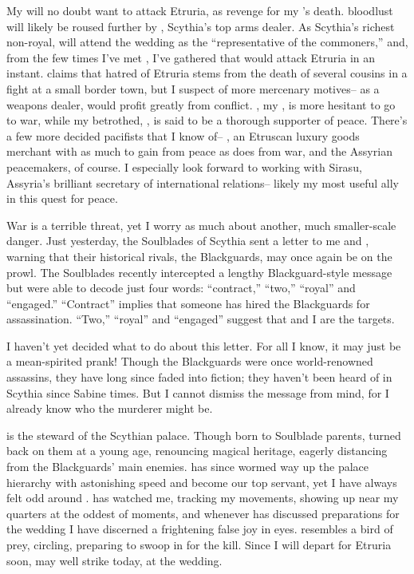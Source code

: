 \documentclass[char]{Kos}
\begin{document}
My \cScythiaQueen{\parent} will no doubt want to attack Etruria, as revenge for my \cFugitive{\sibling}'s death. \cScythiaQueen{\Their} bloodlust will likely be roused further by \cArmsDealer{}, Scythia's top arms dealer. As Scythia's richest non-royal, \cArmsDealer{} will attend the wedding as the ``representative of the commoners,'' and, from the few times I've met \cArmsDealer{\them}, I've gathered that \cArmsDealer{\they} would attack Etruria in an instant. \cArmsDealer{\They} claims that \cArmsDealer{\their} hatred of Etruria stems from the death of several cousins in a fight at a small border town, but I suspect \cArmsDealer{\them} of more mercenary motives-- as a weapons dealer, \cArmsDealer{} would profit greatly from conflict. \cScythiaKing{}, my \cScythiaKing{\parent}, is more hesitant to go to war, while my betrothed, \cGroom{\them}, is said to be a thorough supporter of peace. There's a few more decided pacifists that I know of-- \cMerchant{}, an Etruscan luxury goods merchant with as much to gain from peace as \cArmsDealer{} does from war, and the Assyrian peacemakers, of course. I especially look forward to working with Sirasu, Assyria's brilliant secretary of international relations-- likely my most useful ally in this quest for peace.

War is a terrible threat, yet I worry as much about another, much smaller-scale danger. Just yesterday, the Soulblades of Scythia sent a letter to me and \cGroom{}, warning that their historical rivals, the Blackguards, may once again be on the prowl. The Soulblades recently intercepted a lengthy Blackguard-style message but were able to decode just four words: ``contract,'' ``two,'' ``royal'' and ``engaged.'' ``Contract'' implies that someone has hired the Blackguards for assassination. ``Two,'' ``royal'' and ``engaged'' suggest that \cGroom{} and I are the targets.

I haven't yet decided what to do about this letter. For all I know, it may just be a mean-spirited prank! Though the Blackguards were once world-renowned assassins, they have long since faded into fiction; they haven't been heard of in Scythia since Sabine times. But I cannot dismiss the message from mind, for I already know who the murderer might be.

 is the steward of the Scythian palace. Though born to Soulblade parents,  turned  back on them at a young age, renouncing  magical heritage, eagerly distancing  from the Blackguards' main enemies.  has since wormed  way up the palace hierarchy with astonishing speed and become our top servant, yet I have always felt odd around .  has watched me, tracking my movements, showing up near my quarters at the oddest of moments, and whenever  has discussed preparations for the wedding I have discerned a frightening false joy in  eyes.  resembles a bird of prey, circling, preparing to swoop in for the kill. Since I will depart for Etruria soon,  may well strike today, at the wedding.
\end{document}

